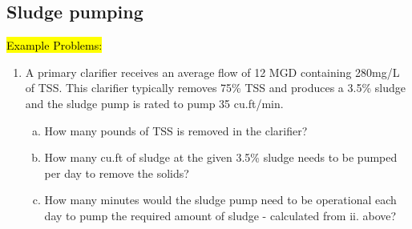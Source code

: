 \subsection{Sludge pumping}

                \hl{Example Problems:}\\
                    \begin{enumerate}
                        \item A primary clarifier receives an average flow of 12 MGD containing 280mg/L of TSS.  This clarifier typically removes 75\% TSS  and produces a 3.5\% sludge and the sludge pump is rated to pump 35 cu.ft/min.
                            \begin{enumerate}[a.]
                                \item How many pounds of TSS is removed in the clarifier?

                                \item How many cu.ft of sludge at the given 3.5\% sludge needs to be pumped per day to remove the solids?

                                \item How many minutes would the sludge pump need to be operational each day to pump the required amount of sludge - calculated from ii.  above?


\end{enumerate}
\end{enumerate}
